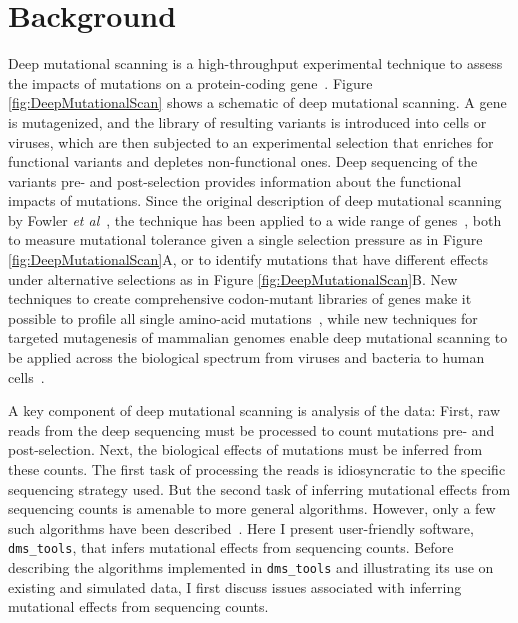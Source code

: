 \documentclass[twocolumn]{bmcart}%
\begin{document}
\section*{Background}
Deep mutational scanning is a high-throughput experimental technique to assess the impacts of mutations on a protein-coding gene~\cite{fowler2014deep}. Figure \ref{fig:DeepMutationalScan} shows a schematic of deep mutational scanning. A gene is mutagenized, and the library of resulting variants is introduced into cells or viruses, which are then subjected to an experimental selection that enriches for functional variants and depletes non-functional ones. Deep sequencing of the variants pre- and post-selection provides information about the functional impacts of mutations. Since the original description of deep mutational scanning by Fowler \textit{et al}~\cite{fowler2010high}, the technique has been applied to a wide range of genes~\cite{traxlmayr2012construction,mclaughlin2012spatial,starita2013activity,melamed2013deep,roscoe2013analyses,firnberg2014comprehensive,bloom2014experimentally,melnikov2014comprehensive,thyagarajan2014inherent,wu2014high,wu2014ns,olson2014comprehensive,kitzman2015massively}, both to measure mutational tolerance given a single selection pressure as in Figure \ref{fig:DeepMutationalScan}A, or to identify mutations that have different effects under alternative selections as in Figure \ref{fig:DeepMutationalScan}B. New techniques to create comprehensive codon-mutant libraries of genes make it possible to profile all single amino-acid mutations~\cite{firnberg2012,jain2013rapid,firnberg2014comprehensive,bloom2014experimentally,melnikov2014comprehensive,kitzman2015massively}, while new techniques for targeted mutagenesis of mammalian genomes enable deep mutational scanning to be applied across the biological spectrum from viruses and bacteria to human cells~\cite{findlay2014saturation}.

A key component of deep mutational scanning is analysis of the data: First, raw reads from the deep sequencing must be processed to count mutations pre- and post-selection. Next, the biological effects of mutations must be inferred from these counts. The first task of processing the reads is idiosyncratic to the specific sequencing strategy used. But the second task of inferring mutational effects from sequencing counts is amenable to more general algorithms. However, only a few such algorithms have been described~\cite{fowler2011enrich,bank2014bayesian}. Here I present user-friendly software, \texttt{dms\_tools}, that infers mutational effects from sequencing counts. Before describing the algorithms implemented in \texttt{dms\_tools} and illustrating its use on existing and simulated data, I first discuss issues associated with inferring mutational effects from sequencing counts.
\end{document}
